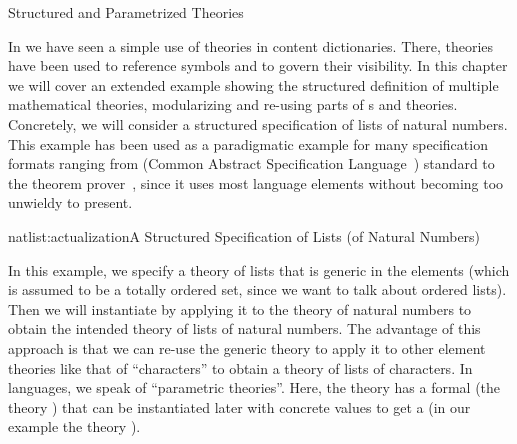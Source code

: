 
\begin{omgroup}[id=natlist]{Structured and Parametrized Theories}

In {} we have seen a simple use of theories in {\openmath} content
dictionaries. There, theories have been used to reference {\openmath} symbols and to
govern their visibility. In this chapter we will cover an extended example showing the
structured definition of multiple mathematical theories, modularizing and re-using parts
of {s} and theories.  Concretely, we will consider a
structured specification of lists of natural numbers. This example has been used as a
paradigmatic example for many specification formats ranging from {\casl} (Common Abstract
Specification Language~\cite{CoFI:2004:CASL-RM}) standard to the {\pvs} theorem prover~\cite{OwRu92},
since it uses most language elements without becoming too unwieldy to present.

\begin{myfig}{natlist:actualization}{A Structured Specification of Lists (of
    Natural Numbers)}
\end{myfig}

In this example, we specify a theory {} of lists that is generic in the
elements (which is assumed to be a totally ordered set, since we want to talk about
ordered lists).  Then we will instantiate {} by applying it to the theory
{} of natural numbers to obtain the intended theory {}
of lists of natural numbers.  The advantage of this approach is that we can re-use the
generic theory {} to apply it to other element theories like that of
``characters'' to obtain a theory of lists of characters.  In
{} languages, we speak of ``parametric theories''.
Here, the theory {} has a formal {} (the theory
{}) that can be instantiated later with concrete values to get a
{} (in our example the theory {}).


\end{omgroup}
